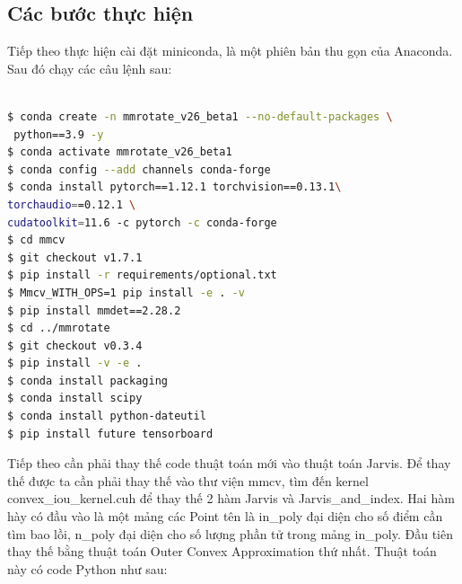 \documentclass[12pt,a4paper,openany,oneside]{report}
\begin{document}
\subsection{Các bước thực hiện}
Tiếp theo thực hiện cài đặt miniconda, là một phiên bản thu gọn của Anaconda. Sau đó chạy các câu lệnh sau:


\begin{lstlisting}[language=bash, caption={Mô tả lệnh command line để tạo môi trường ảo}, label={lst:command-line}]

$ conda create -n mmrotate_v26_beta1 --no-default-packages \
 python==3.9 -y 
$ conda activate mmrotate_v26_beta1 
$ conda config --add channels conda-forge 
$ conda install pytorch==1.12.1 torchvision==0.13.1\ 
torchaudio==0.12.1 \
cudatoolkit=11.6 -c pytorch -c conda-forge 
$ cd mmcv
$ git checkout v1.7.1
$ pip install -r requirements/optional.txt 
$ Mmcv_WITH_OPS=1 pip install -e . -v 
$ pip install mmdet==2.28.2 
$ cd ../mmrotate 
$ git checkout v0.3.4
$ pip install -v -e . 
$ conda install packaging 
$ conda install scipy 
$ conda install python-dateutil
$ pip install future tensorboard

\end{lstlisting}

Tiếp theo cần phải thay thế code thuật toán mới vào thuật toán Jarvis. Để thay thế được ta cần phải thay thế vào thư viện mmcv, tìm đến kernel convex\_iou\_kernel.cuh để thay thế 2 hàm Jarvis và Jarvis\_and\_index. Hai hàm hày có đầu vào là một mảng các Point tên là in\_poly đại diện cho số điểm cần tìm bao lồi, n\_poly đại diện cho số lượng phần tử trong mảng in\_poly. Đầu tiên thay thế bằng thuật toán Outer Convex Approximation thứ nhất. Thuật toán này có code Python như sau:
\end{document}
